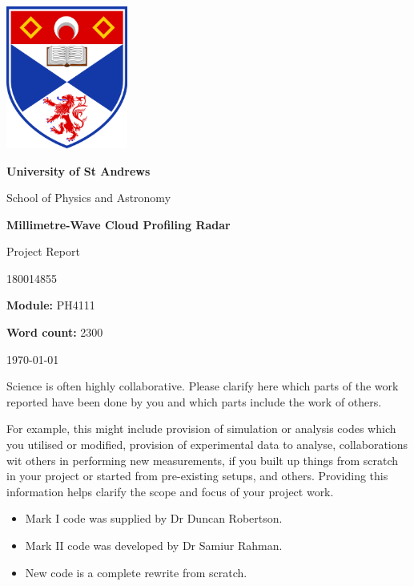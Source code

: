 \documentclass{article}
\title {\mytitle}
\author{\myauthor}
\date  {\mydate}
\newcommand\mytitle    {Millimetre-Wave Cloud Profiling Radar}
\newcommand\mysubtitle {Project Report}
\newcommand\myauthor   {180014855}
\newcommand\mymodule   {PH4111}
\newcommand\mywordcount{2300}
\begin{document}
\begin{titlepage}
	\centering
	{\includegraphics[width=0.3\textwidth]{uos-logo}}
	\par
	{\LARGE\bfseries University of St Andrews\par}
	{\LARGE School of Physics and Astronomy\par}
	\vspace{1.5cm}
	{\huge\bfseries\mytitle\par}
	{\Large\mysubtitle\par}
	\vspace{2cm}
	{\Large\myauthor\par}
	{\large\textbf{Module:} \mymodule\par}
	{\large\textbf{Word count:} \mywordcount\par}
	\vfill
	{\large\today\par}
\end{titlepage}

Science is often highly collaborative. Please clarify here which parts of the work reported have been done by you and which parts include the work of others.

For example, this might include provision of simulation or analysis codes which you utilised or modified, provision of experimental data to analyse, collaborations wit others in performing new measurements, if you built up things from scratch in your project or started from pre-existing setups, and others. Providing this information helps clarify the scope and focus of your project work.

\begin{itemize}
	\item Mark I code was supplied by Dr Duncan Robertson.
	\item Mark II code was developed by Dr Samiur Rahman.
	\item New code is a complete rewrite from scratch.
\end{itemize}

\clearpage
\setcounter{page}{1}

\begin{abstract}
	Insert abstract here.
\end{abstract}
\end{document}
